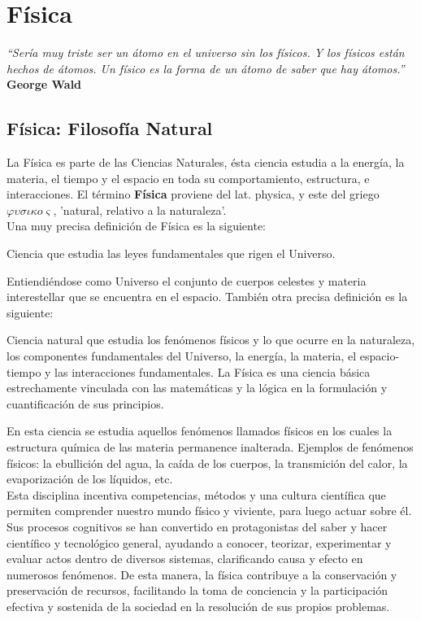 \chapter{Física}

\textit{``Sería muy triste ser un átomo en el universo sin los físicos. Y los físicos están hechos de átomos. Un físico es la 
forma de un átomo de saber que hay átomos.''} \textbf{George Wald}
\vspace{1.0 cm}

\section{Física: Filosofía Natural}

La Física es parte de las Ciencias Naturales, ésta ciencia estudia a la energía, la materia, el tiempo y el espacio en toda su 
comportamiento, estructura, e interacciones. El término \textbf{Física} proviene del lat. physica, y este del griego 
$\varphi\upsilon\sigma\iota\kappa o\varsigma$, 'natural, relativo a la naturaleza'.\\

Una muy precisa definición de Física es la siguiente:

\begin{tcolorbox}
Ciencia que estudia las leyes fundamentales que rigen el Universo.
\end{tcolorbox}

Entiendiéndose como Universo el conjunto de cuerpos celestes y materia interestellar que se encuentra en el espacio. También otra 
precisa definición es la siguiente:

\begin{tcolorbox}
Ciencia natural que estudia los fenómenos físicos y lo que ocurre en la naturaleza, los componentes fundamentales del Universo, 
la 
energía, la materia, el espacio-tiempo y las interacciones fundamentales. La Física es una ciencia básica estrechamente vinculada 
con las matemáticas y la lógica en la formulación y cuantificación de sus principios.
\end{tcolorbox}

En esta ciencia se estudia aquellos fenómenos llamados físicos en los cuales la estructura química de las materia permanence 
inalterada. Ejemplos de fenómenos físicos: la ebullición del agua, la caída de los cuerpos, la transmición del calor, la 
evaporización de los líquidos, etc.\\

Esta disciplina incentiva competencias, métodos y una cultura científica que permiten comprender nuestro mundo físico y viviente, 
para luego actuar sobre él. Sus procesos cognitivos se han convertido en protagonistas del saber y hacer científico y tecnológico 
general, ayudando a conocer, teorizar, experimentar y evaluar actos dentro de diversos sistemas, clarificando causa y efecto en 
numerosos fenómenos. De esta manera, la física contribuye a la conservación y preservación de recursos, facilitando la toma de 
conciencia y la participación efectiva y sostenida de la sociedad en la resolución de sus propios problemas.\\

